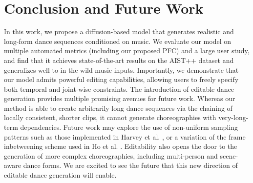 \documentclass[10pt,twocolumn,letterpaper]{article}
\begin{document}
\section{Conclusion and Future Work}

In this work, we propose a diffusion-based model that generates realistic and long-form dance sequences conditioned on music.
We evaluate our model on multiple automated metrics (including our proposed PFC) and a large user study, and find that it achieves state-of-the-art results on the AIST++ dataset and generalizes well to in-the-wild music inputs.
Importantly, we demonstrate that our model admits powerful editing capabilities, allowing users to freely specify both temporal and joint-wise constraints.
The introduction of editable dance generation provides multiple promising avenues for future work.
Whereas our method is able to create arbitrarily long dance sequences via the chaining of locally consistent, shorter clips, it cannot generate choreographies with very-long-term dependencies. Future work may explore the use of non-uniform sampling patterns such as those implemented in Harvey et al. \cite{harvey2022flexible}, or a variation of the frame inbetweening scheme used in Ho et al. \cite{ho2022imagen}.
Editability also opens the door to the generation of more complex choreographies, including multi-person and scene-aware dance forms.
We are excited to see the future that this new direction of editable dance generation will enable.

{\small


}

\ifarxiv \clearpage  \fi
\end{document}
